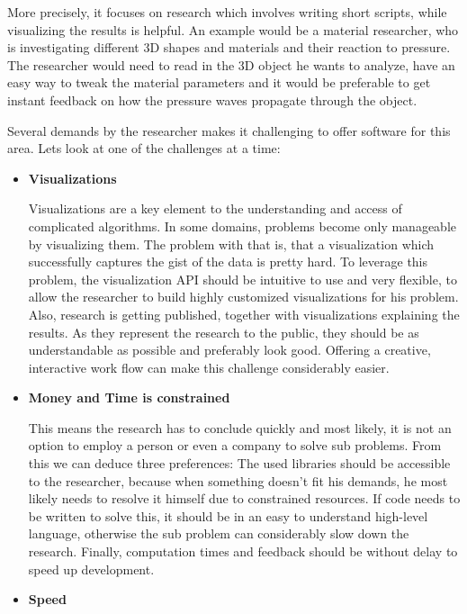 More precisely, it focuses on research which involves writing short scripts, while visualizing the results is helpful. 
An example would be a material researcher, who is investigating different 3D shapes and materials and their reaction to pressure.
The researcher would need to read in the 3D object he wants to analyze, have an easy way to tweak the material parameters and it would be preferable to get instant feedback on how the pressure waves propagate through the object.

Several demands by the researcher makes it challenging to offer software for this area.
Lets look at one of the challenges at a time:

\begin{itemize} 

    \item  \textbf{Visualizations}

    Visualizations are a key element to the understanding and access of complicated algorithms.
    In some domains, problems become only manageable by visualizing them.
    The problem with that is, that a visualization which successfully captures the gist of the data is pretty hard.
    To leverage this problem, the visualization API should be intuitive to use and very flexible, to allow the researcher to build highly customized visualizations for his problem.
    Also, research is getting published, together with visualizations explaining the results. As they represent the research to the public, they should be as understandable as possible and preferably look good.
    Offering a creative, interactive work flow can make this challenge considerably easier.

    \item \textbf{Money and Time is constrained}
    
    This means the research has to conclude quickly and most likely, it is not an option to employ a person or even a company to solve sub problems.
    From this we can deduce three preferences: 
    The used libraries should be accessible to the researcher, because when something doesn't fit his demands, he most likely needs to resolve it himself due to constrained resources.
    If code needs to be written to solve this, it should be in an easy to understand high-level language, otherwise the sub problem can considerably slow down the research.
    Finally, computation times and feedback should be without delay to speed up development. 

    \item \textbf{Speed}
    

\end{itemize}
